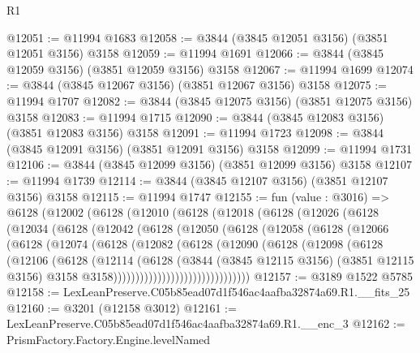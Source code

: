 \begin{lexlean}{R1}
\begin{coremodule}
@12051 := @11994 @1683
@12058 := @3844 (@3845 @12051 @3156) (@3851 @12051 @3156) @3158
@12059 := @11994 @1691
@12066 := @3844 (@3845 @12059 @3156) (@3851 @12059 @3156) @3158
@12067 := @11994 @1699
@12074 := @3844 (@3845 @12067 @3156) (@3851 @12067 @3156) @3158
@12075 := @11994 @1707
@12082 := @3844 (@3845 @12075 @3156) (@3851 @12075 @3156) @3158
@12083 := @11994 @1715
@12090 := @3844 (@3845 @12083 @3156) (@3851 @12083 @3156) @3158
@12091 := @11994 @1723
@12098 := @3844 (@3845 @12091 @3156) (@3851 @12091 @3156) @3158
@12099 := @11994 @1731
@12106 := @3844 (@3845 @12099 @3156) (@3851 @12099 @3156) @3158
@12107 := @11994 @1739
@12114 := @3844 (@3845 @12107 @3156) (@3851 @12107 @3156) @3158
@12115 := @11994 @1747
@12155 := fun (value : @3016) =>
  @6128
    (@12002
      (@6128
        (@12010
          (@6128
            (@12018
              (@6128
                (@12026
                  (@6128
                    (@12034
                      (@6128
                        (@12042
                          (@6128
                            (@12050
                              (@6128
                                (@12058
                                  (@6128
                                    (@12066
                                      (@6128
                                        (@12074
                                          (@6128
                                            (@12082
                                              (@6128
                                                (@12090
                                                  (@6128
                                                    (@12098
                                                      (@6128
                                                        (@12106
                                                          (@6128
                                                            (@12114
                                                              (@6128
                                                                (@3844
                                                                  (@3845 @12115 @3156)
                                                                  (@3851 @12115 @3156)
                                                                  @3158
                                                                  @3158)))))))))))))))))))))))))))))))
@12157 := @3189 @1522 @5785
@12158 := LexLeanPreserve.C05b85ead07d1f546ac4aafba32874a69.R1.__fits_25
@12160 := @3201 (@12158 @3012)
@12161 := LexLeanPreserve.C05b85ead07d1f546ac4aafba32874a69.R1.__enc_3
@12162 := PrismFactory.Factory.Engine.levelNamed

\end{coremodule}
\end{lexlean}

